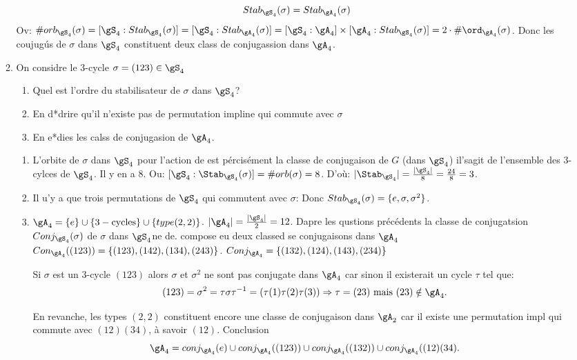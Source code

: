 \begin{enumerate}
\begin{enumerate}
\begin{remark}
		$$Stab_{\gS_4}(\sigma)=Stab_{\gA_4}(\sigma)$$
		Ov: $\#orb_{\gS_4}(\sigma)=[\gS_4: Stab_{\gS_4}(\sigma)]=[\gS_4: Stab_{\gA_4}(\sigma)]=[\gS_4:\gA_4]\times[\gA_4: Stab_{\gS_4}(\sigma)]=2\cdot \#\ord_{\gA_4}(\sigma)$. Donc les coujugús de $\sigma$ dans $\gS_4$ constituent deux class de conjugassion dans $\gA_4$.
	\end{remark}
	\item On considre le 3-cycle $\sigma=(123)\in\gS_4$
		\begin{enumerate}
			\item Quel est l'ordre du stabilisateur de $\sigma$ dans $\gS_4$?
			\item En d*drire qu'il n'existe pas de permutation impline qui commute avec $\sigma$
			\item En e*dies les calss de conjugasion de $\gA_4$.
		\end{enumerate}
		\begin{enumerate}
			\item L'orbite de $\sigma$ dans $\gS_4$ pour l'action de est pércisément la classe de conjugaison de $G$ (dans $\gS_4$) il'sagit de l'ensemble des 3-cylces de $\gS_4$. Il y en a 8. Ou: $[\gS_4: \Stab_{\gS_4}(\sigma)]=\#orb(\sigma)=8$. D'où: $|\Stab_{\gS_4}|=\frac{|\gS_4|}{8}=\frac{24}{8}=3$.
			\item Il u'y a que trois permutations de $\gS_4$ qui commutent avec $\sigma$: Donc $Stab_{\gS_4}(\sigma)=\{e,\sigma,\sigma^2\}$.
			\item $\gA_4=\{e\}\cup\{3-\text{cycles}\}\cup\{type(2,2)\}$. $|\gA_4|=\frac{|\gS_4|}2=12$.
			Dapre les qustions précédents la classe de conjugatsion $Conj_{\gS_4}(\sigma)$ de $\sigma$ dans $\gS_4$ne de. compose eu deux classed se conjugaisons dans $\gA_4$ $Con_{\gA_4}((123))=\{(123), (142), (134), (243)\}$. $Conj_{\gA_4}=\{(132), (124), (143), (234)\}$
			\begin{remark}
				Si $\sigma$ est un 3-cycle $(123)$ alors $\sigma$ et $\sigma^2$ ne sont pas conjugate dans $\gA_4$ car sinon il existerait un cycle $\tau$ tel que:
				$$(123)=\sigma^2=\tau\sigma\tau^{-1}=(\tau(1)\tau(2)\tau(3)) \Rightarrow \tau=(23) \mbox{ mais } (23)\notin \gA_4.$$
			\end{remark}
			En revanche, les types $(2,2)$ constituent encore une classe de conjugaison dans $\gA_2$ car il existe une permutation impl qui commute avec $(12)(34)$, à savoir $(12)$. Conclusion $$\gA_4=conj_{\gA_4}(e)\cup conj_{\gA_4}((123))\cup conj_{\gA_4}((132))\cup conj_{\gA_4}((12)(34).$$
		\end{enumerate}

\end{enumerate}
\end{enumerate}
